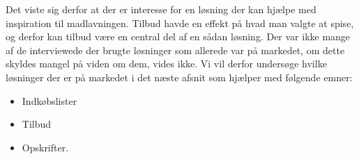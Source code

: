 Det viste sig derfor at der er interesse for en løsning der kan hjælpe med inspiration til madlavningen. 
Tilbud havde en effekt på hvad man valgte at spise, og derfor kan tilbud være en central del af en sådan løsning.
Der var ikke mange af de interviewede der brugte løsninger som allerede var på markedet, om dette skyldes mangel på viden om dem, vides ikke.
Vi vil derfor undersøge hvilke løsninger der er på markedet i det næste afsnit som hjælper med følgende emner:


\begin{itemize}
	\item Indkøbslister
	\item Tilbud
	\item Opskrifter.
\end{itemize}

